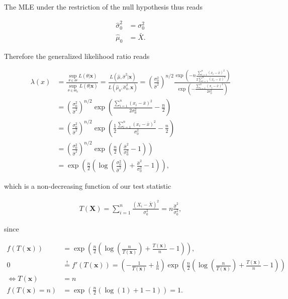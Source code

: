 \begin{solution}
The MLE under the restriction of the null hypothesis thus reads

\begin{align*}
  \hat{\sigma}_0^2 &= \sigma_0^2 \\
  \hat{\mu}_0 &= \bar{X}.
\end{align*}

Therefore the generalized likelihood ratio reads

\begin{align*}
  \lambda(x) &= \frac{\sup_{\theta \in \Theta} L(\theta | \textbf{x})}{\sup_{\theta \in \Theta_0} L(\theta | \textbf{x})}
  = \frac{L(\hat{\mu}, \hat{\sigma}^2 | \textbf{x})}{L(\hat{\mu}_0, \hat{\sigma}^2_0, \textbf{x})} 
  = \left(\frac{\sigma_0^2}{\hat{\sigma}^2}\right)^{n/2}\frac{\exp\left(-n\frac{\sum_{i=1}^n(x_i - \bar{x})^2}{2\sum_{i=1}^n (x_i - \bar{x})^2}\right)}
  {\exp\left(-\frac{\sum_{i=1}^n (x_i - \bar{x})^2}{2\sigma_0^2}\right)} \\
  &= \left(\frac{\sigma_0^2}{\hat{\sigma}^2}\right)^{n/2}\exp\left(\frac{\sum_{i=1}^n (x_i - \bar{x})^2}{2\sigma_0^2}-\frac{n}{2}\right) \\
  &= \left(\frac{\sigma_0^2}{\hat{\sigma}^2}\right)^{n/2}\exp\left(\frac{1}{2}\frac{\sum_{i=1}^n (x_i - \bar{x})^2}{\sigma_0^2}-\frac{n}{2}\right) \\
  &= \left(\frac{\sigma_0^2}{\hat{\sigma}^2}\right)^{n/2}\exp\left(\frac{n}{2}\left(\frac{\hat{\sigma}^2}{\sigma_0^2}-1\right)\right) \\
  &= \exp\left(\frac{n}{2}\left(\log\left(\frac{\sigma_0^2}{\hat{\sigma}^2}\right) + \frac{\hat{\sigma}^2}{\sigma_0^2}-1\right)\right),
\end{align*}

which is a non-decreasing function of our test statistic

\begin{align*}
  T(\textbf{X}) = \sum_{i=1}^n \frac{(X_i - \bar{X})^2}{\sigma_0^2} = n\frac{\hat{\sigma}^2}{\sigma_0^2},
\end{align*}

since

\begin{align*}
  f(T(\textbf{x})) &= \exp\left(\frac{n}{2}\left( \log\left(\frac{n}{T(\textbf{x})}\right) +  \frac{T(\textbf{x})}{n} - 1\right)\right), \\
  0 &\stackrel{!}{=} f'(T(\textbf{x})) 
  = \left(-\frac{1}{T(\textbf{x})} + \frac{1}{n}\right)
  \exp\left(\frac{n}{2}\left( \log\left(\frac{n}{T(\textbf{x})}\right) +  
  \frac{T(\textbf{x})}{n} - 1\right)\right) \\
  \iff T(\textbf{x}) &= n \\
  f(T(\textbf{x}) = n) &= \exp\left(\frac{n}{2}\left( \log(1) +  1 - 1\right)\right) = 1.
\end{align*}


\end{solution}
